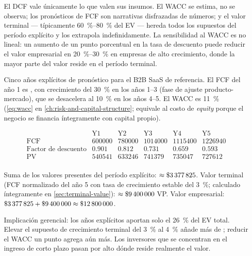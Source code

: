 El DCF vale únicamente lo que valen sus insumos. El WACC se estima, no se observa; los pronósticos de FCF
son narrativas disfrazadas de números; y el valor terminal --- típicamente
\qty{60}{\percent}--\qty{80}{\percent} del EV --- hereda todos los supuestos del período explícito y los
extrapola indefinidamente. La sensibilidad al WACC es no lineal: un aumento de un punto porcentual en la
tasa de descuento puede reducir el valor empresarial en \qty{20}{\percent}--\qty{30}{\percent} en empresas
de alto crecimiento, donde la mayor parte del valor reside en el período terminal.

\begin{example}
Cinco años explícitos de pronóstico para el B2B SaaS de referencia. El FCF del año 1 es ,
con crecimiento del \qty{30}{\percent} en los años 1--3 (fase de ajuste producto-mercado), que se
desacelera al \qty{10}{\percent} en los años 4--5. El WACC es \qty{11}{\percent} (\cref{eq:wacc}
en \cref{ch:risk-and-capital-structure}; equivale al costo de \emph{equity} porque el negocio
se financia íntegramente con capital propio).

\[
\begin{array}{lrrrrrr}
  & \mathrm{Y1} & \mathrm{Y2} & \mathrm{Y3} & \mathrm{Y4} & \mathrm{Y5} \\[2pt]
  \mathrm{FCF} & \num{600000} & \num{780000} & \num{1014000} & \num{1115400} & \num{1226940} \\
  \text{Factor de descuento} & 0.901 & 0.812 & 0.731 & 0.659 & 0.593 \\
  \mathrm{PV} & \num{540541} & \num{633246} & \num{741379} & \num{735047} & \num{727612} \\
\end{array}
\]

Suma de los valores presentes del período explícito: \(\approx\$\num{3377825}\).
Valor terminal (FCF normalizado del año 5 con tasa de crecimiento estable del \qty{3}{\percent};
calculado íntegramente en \cref{sec:terminal-value}): \(\approx\$\num{9400000}\) VP.
Valor empresarial: \(\$\num{3377825}+\$\num{9400000}\approx\$\num{12800000}\).

Implicación gerencial: los años explícitos aportan solo el \qty{26}{\percent} del EV total.
Elevar el supuesto de crecimiento terminal del \qty{3}{\percent} al \qty{4}{\percent} añade más
de ; reducir el WACC un punto agrega aún más. Los inversores que se concentran
en el ingreso de corto plazo pasan por alto dónde reside realmente el valor.
\end{example}

